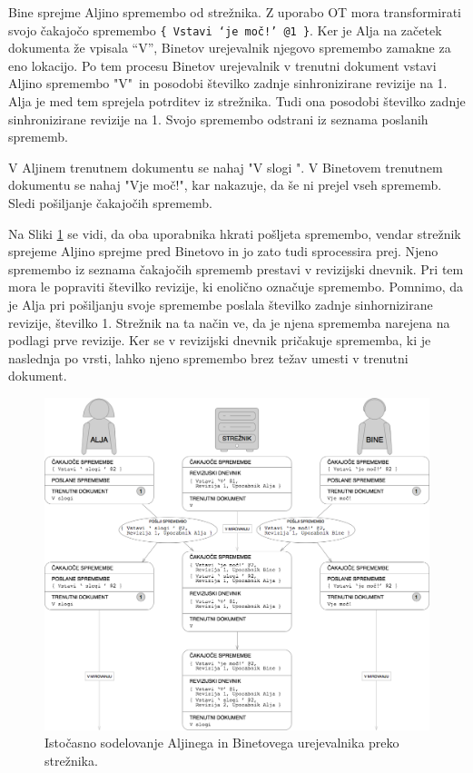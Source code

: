 \documentclass[a4paper, 12pt, twoside]{book}
\begin{document}
Bine sprejme Aljino spremembo od strežnika. Z uporabo OT mora transformirati svojo čakajočo spremembo {\tt \{ Vstavi ‘je moč!’ @1 \}}. Ker je Alja na začetek dokumenta že vpisala “V”, Binetov urejevalnik njegovo spremembo zamakne za eno lokacijo. Po tem procesu Binetov urejevalnik v trenutni dokument vstavi Aljino spremembo "V"\ in posodobi številko zadnje sinhronizirane revizije na 1. Alja je med tem sprejela potrditev iz strežnika. Tudi ona posodobi številko zadnje sinhronizirane revizije na 1. Svojo spremembo odstrani iz seznama poslanih sprememb.

V Aljinem trenutnem dokumentu se nahaj "V slogi ". V Binetovem trenutnem dokumentu se nahaj "Vje moč!", kar nakazuje, da še ni prejel vseh sprememb. Sledi pošiljanje čakajočih sprememb.

\pagebreak

Na Sliki \ref{pc4} se vidi, da oba uporabnika hkrati pošljeta spremembo, vendar strežnik sprejeme Aljino sprejme pred Binetovo in jo zato tudi sprocessira prej. Njeno spremembo iz seznama čakajočih sprememb prestavi v revizijski dnevnik. Pri tem mora le popraviti številko revizije, ki enolično označuje spremembo. Pomnimo, da je Alja pri pošiljanju svoje spremembe poslala številko zadnje sinhornizirane revizije, številko 1. Strežnik na ta način ve, da je njena sprememba narejena na podlagi prve revizije. Ker se v revizijski dnevnik pričakuje sprememba, ki je naslednja po vrsti, lahko njeno spremembo brez težav umesti v trenutni dokument.

\begin{figure}[placement h]
\begin{center}
\includegraphics[width=14cm]{pc4.png}
\end{center}
\caption{Istočasno sodelovanje Aljinega in Binetovega urejevalnika preko strežnika.}
\label{pc4}
\end{figure}
\end{document}
